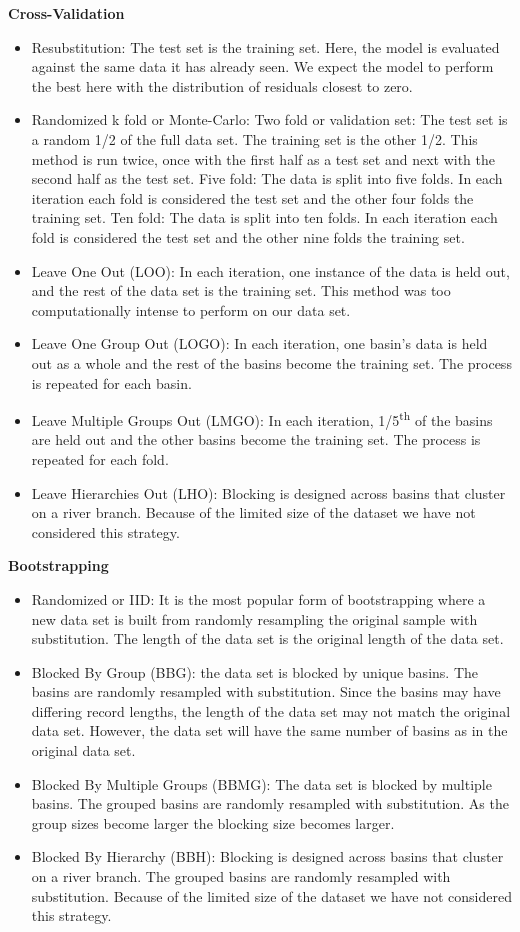 \textbf{Cross-Validation}
\begin{itemize}
	\item Resubstitution: The test set is the training set. Here, the model is evaluated against the same data it has already seen. We expect the model to perform the best here with the distribution of residuals closest to zero. 
	\item Randomized k fold or Monte-Carlo:
		\subitem Two fold or validation set: The test set is a random 1/2 of the full data set. The training set is the other 1/2. This method is run twice, once with the first half as a test set and next with the second half as the test set. 
		\subitem Five fold: The data is split into five folds. In each iteration each fold is considered the test set and the other four folds the training set. 
		\subitem Ten fold: The data is split into ten folds. In each iteration each fold is considered the test set and the other nine folds the training set. 
	\item Leave One Out (LOO): In each iteration, one instance of the data is held out, and the rest of the data set is the training set. This method was too computationally intense to perform on our data set.
	\item Leave One Group Out (LOGO): In each iteration, one basin's data is held out as a whole and the rest of the basins become the training set. The process is repeated for each basin. 
	\item Leave Multiple Groups Out (LMGO): In each iteration, 1/5\textsuperscript{th} of the basins are held out and the other basins become the training set. The process is repeated for each fold. 
	\item Leave Hierarchies Out (LHO): Blocking is designed across basins that cluster on a river branch. Because of the limited size of the dataset we have not considered this strategy. 
\end{itemize}

\textbf{Bootstrapping}
\begin{itemize}
	\item Randomized or IID: It is the most popular form of bootstrapping where a new data set is built from randomly resampling the original sample with substitution. The length of the data set is the original length of the data set.
	\item Blocked By Group (BBG): the data set is blocked by unique basins. The basins are randomly resampled with substitution. Since the basins may have differing record lengths, the length of the data set may not match the original data set. However, the data set will have the same number of basins as in the original data set. 
	\item Blocked By Multiple Groups (BBMG): The data set is blocked by multiple basins. The grouped basins are randomly resampled with substitution. As the group sizes become larger the blocking size becomes larger. 
	\item Blocked By Hierarchy (BBH): Blocking is designed across basins that cluster on a river branch. The grouped basins are randomly resampled with substitution. Because of the limited size of the dataset we have not considered this strategy.
\end{itemize}

